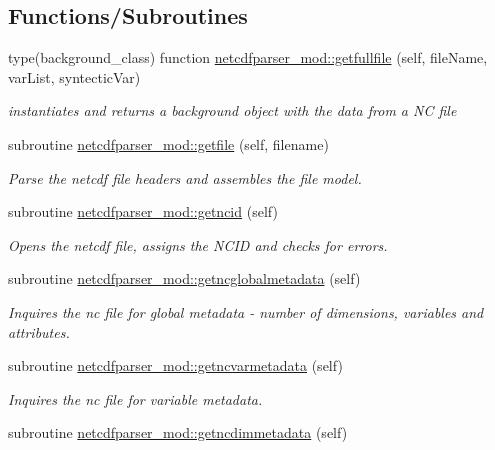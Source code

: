 \subsection*{Functions/\+Subroutines}
\begin{DoxyCompactItemize}
\item 
type(background\+\_\+class) function \mbox{\hyperlink{namespacenetcdfparser__mod_ada78b9f33d39c4763f412f004524cbea}{netcdfparser\+\_\+mod\+::getfullfile}} (self, file\+Name, var\+List, syntectic\+Var)
\begin{DoxyCompactList}\small\item\em instantiates and returns a background object with the data from a NC file \end{DoxyCompactList}\item 
subroutine \mbox{\hyperlink{namespacenetcdfparser__mod_a57c39a4003778a6bf90cfd36b69380bc}{netcdfparser\+\_\+mod\+::getfile}} (self, filename)
\begin{DoxyCompactList}\small\item\em Parse the netcdf file headers and assembles the file model. \end{DoxyCompactList}\item 
subroutine \mbox{\hyperlink{namespacenetcdfparser__mod_a741dd5b5985255e73aa9d3cf08755e91}{netcdfparser\+\_\+mod\+::getncid}} (self)
\begin{DoxyCompactList}\small\item\em Opens the netcdf file, assigns the N\+C\+ID and checks for errors. \end{DoxyCompactList}\item 
subroutine \mbox{\hyperlink{namespacenetcdfparser__mod_a409f59662d71fb63e5fb5e057fdfd6ee}{netcdfparser\+\_\+mod\+::getncglobalmetadata}} (self)
\begin{DoxyCompactList}\small\item\em Inquires the nc file for global metadata -\/ number of dimensions, variables and attributes. \end{DoxyCompactList}\item 
subroutine \mbox{\hyperlink{namespacenetcdfparser__mod_a46989199271acb6205cc61ac413d5a56}{netcdfparser\+\_\+mod\+::getncvarmetadata}} (self)
\begin{DoxyCompactList}\small\item\em Inquires the nc file for variable metadata. \end{DoxyCompactList}\item 
subroutine \mbox{\hyperlink{namespacenetcdfparser__mod_a6354ee8b3c773cc7a5ad247ad1e34eeb}{netcdfparser\+\_\+mod\+::getncdimmetadata}} (self)

\end{DoxyCompactItemize}
